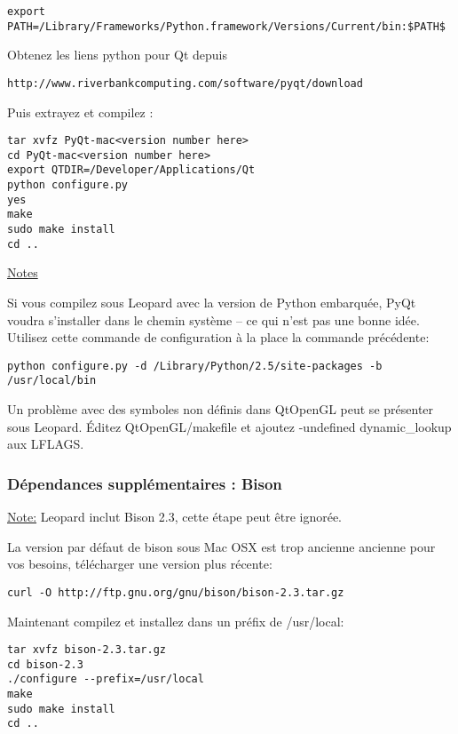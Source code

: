\begin{verbatim}
export PATH=/Library/Frameworks/Python.framework/Versions/Current/bin:$PATH$
\end{verbatim}

Obtenez les liens python pour Qt depuis

\begin{verbatim}
http://www.riverbankcomputing.com/software/pyqt/download
\end{verbatim}

Puis extrayez et compilez :

\begin{verbatim}
tar xvfz PyQt-mac<version number here>
cd PyQt-mac<version number here>
export QTDIR=/Developer/Applications/Qt
python configure.py 
yes 
make 
sudo make install 
cd ..  
\end{verbatim}

\underline{Notes}

Si vous compilez sous Leopard avec la version de Python embarquée, PyQt voudra s'installer dans le chemin système -- ce qui n'est pas une bonne idée. Utilisez cette commande de configuration à la place la commande précédente:

\begin{verbatim}
python configure.py -d /Library/Python/2.5/site-packages -b /usr/local/bin
\end{verbatim}

Un problème avec des symboles non définis dans QtOpenGL peut se présenter sous Leopard.  Éditez
QtOpenGL/makefile et ajoutez -undefined dynamic\_lookup aux LFLAGS.

\subsubsection{Dépendances supplémentaires : Bison}
\underline{Note:} Leopard inclut Bison 2.3, cette étape peut être ignorée.

La version par défaut de bison sous Mac OSX est trop ancienne ancienne pour vos besoins, télécharger une version plus récente:

\begin{verbatim}
curl -O http://ftp.gnu.org/gnu/bison/bison-2.3.tar.gz 
\end{verbatim}

Maintenant compilez et installez dans un préfix de /usr/local:

\begin{verbatim}
tar xvfz bison-2.3.tar.gz 
cd bison-2.3 
./configure --prefix=/usr/local 
make
sudo make install 
cd ..  
\end{verbatim}

